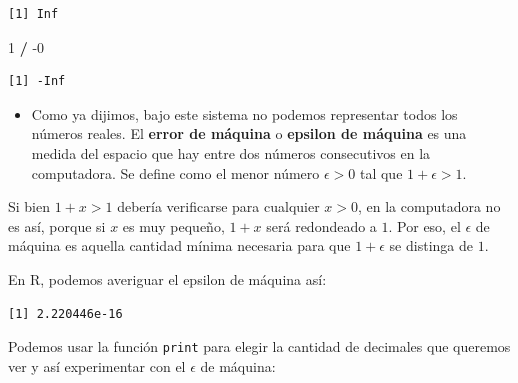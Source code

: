 \documentclass[openany]{book}
\newenvironment{Shaded}{\begin{snugshade}}{\end{snugshade}}
\newcommand{\DataTypeTok}[1]{\textcolor[rgb]{0.13,0.29,0.53}{#1}}
\newcommand{\DecValTok}[1]{\textcolor[rgb]{0.00,0.00,0.81}{#1}}
\newcommand{\KeywordTok}[1]{\textcolor[rgb]{0.13,0.29,0.53}{\textbf{#1}}}
\newcommand{\NormalTok}[1]{#1}
\newcommand{\OperatorTok}[1]{\textcolor[rgb]{0.81,0.36,0.00}{\textbf{#1}}}
\newcommand{\StringTok}[1]{\textcolor[rgb]{0.31,0.60,0.02}{#1}}
\providecommand{\tightlist}{%
  \setlength{\itemsep}{0pt}\setlength{\parskip}{0pt}}
\begin{document}
\begin{verbatim}
[1] Inf
\end{verbatim}

\begin{Shaded}
\begin{Highlighting}[]
\DecValTok{1} \OperatorTok{/}\StringTok{ }\DecValTok{-0}
\end{Highlighting}
\end{Shaded}

\begin{verbatim}
[1] -Inf
\end{verbatim}

\begin{itemize}
\tightlist
\item
  Como ya dijimos, bajo este sistema no podemos representar todos los números reales. El \textbf{error de máquina} o \textbf{epsilon de máquina} es una medida del espacio que hay entre dos números consecutivos en la computadora. Se define como el menor número \(\epsilon > 0\) tal que \(1 + \epsilon > 1\).
\end{itemize}

Si bien \(1 + x > 1\) debería verificarse para cualquier \(x > 0\), en la computadora no es así, porque si \(x\) es muy pequeño, \(1 + x\) será redondeado a \(1\). Por eso, el \(\epsilon\) de máquina es aquella cantidad mínima necesaria para que \(1 + \epsilon\) se distinga de \(1\).

En R, podemos averiguar el epsilon de máquina así:

\begin{Shaded}
\end{Shaded}

\begin{verbatim}
[1] 2.220446e-16
\end{verbatim}

Podemos usar la función \texttt{print} para elegir la cantidad de decimales que queremos ver y así experimentar con el \(\epsilon\) de máquina:

\begin{Shaded}
\end{Shaded}
\end{document}
